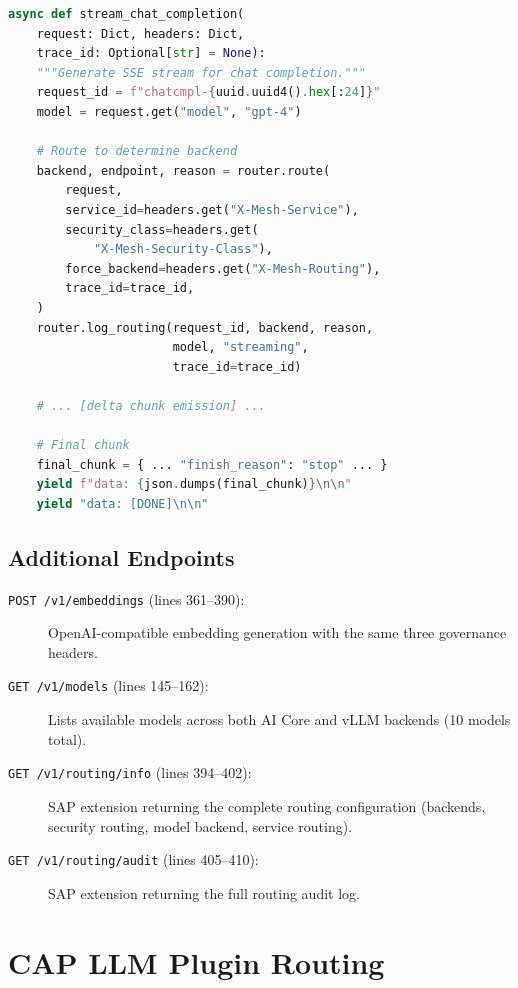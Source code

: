 \documentclass[11pt]{article}
\begin{document}
\begin{lstlisting}[language=Python,caption={SSE streaming generator (server.py, lines 230--277)},firstnumber=230]
async def stream_chat_completion(
    request: Dict, headers: Dict,
    trace_id: Optional[str] = None):
    """Generate SSE stream for chat completion."""
    request_id = f"chatcmpl-{uuid.uuid4().hex[:24]}"
    model = request.get("model", "gpt-4")

    # Route to determine backend
    backend, endpoint, reason = router.route(
        request,
        service_id=headers.get("X-Mesh-Service"),
        security_class=headers.get(
            "X-Mesh-Security-Class"),
        force_backend=headers.get("X-Mesh-Routing"),
        trace_id=trace_id,
    )
    router.log_routing(request_id, backend, reason,
                       model, "streaming",
                       trace_id=trace_id)

    # ... [delta chunk emission] ...

    # Final chunk
    final_chunk = { ... "finish_reason": "stop" ... }
    yield f"data: {json.dumps(final_chunk)}\n\n"
    yield "data: [DONE]\n\n"
\end{lstlisting}

\subsection{Additional Endpoints}

\begin{description}
  \item[\texttt{POST /v1/embeddings} (lines 361--390):] OpenAI-compatible
        embedding generation with the same three governance headers.
  \item[\texttt{GET /v1/models} (lines 145--162):] Lists available models
        across both AI Core and vLLM backends (10 models total).
  \item[\texttt{GET /v1/routing/info} (lines 394--402):] SAP extension
        returning the complete routing configuration (backends, security
        routing, model backend, service routing).
  \item[\texttt{GET /v1/routing/audit} (lines 405--410):] SAP extension
        returning the full routing audit log.
\end{description}

\section{CAP LLM Plugin Routing}
\label{sec:cap-llm-plugin}
\end{document}
